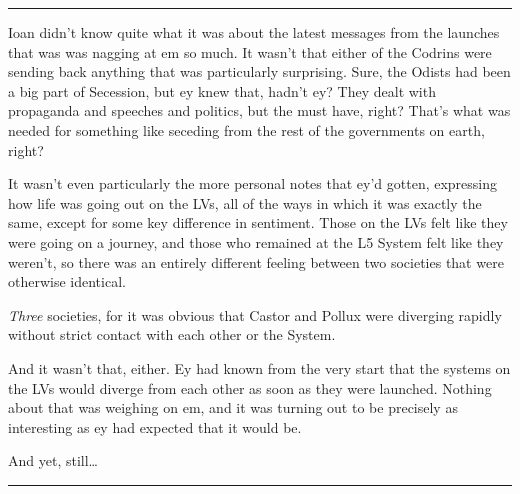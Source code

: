 \begin{center}\rule{0.5\linewidth}{0.5pt}\end{center}

Ioan didn't know quite what it was about the latest messages from the launches that was was nagging at em so much. It wasn't that either of the Codrins were sending back anything that was particularly surprising. Sure, the Odists had been a big part of Secession, but ey knew that, hadn't ey? They dealt with propaganda and speeches and politics, but the must have, right? That's what was needed for something like seceding from the rest of the governments on earth, right?

It wasn't even particularly the more personal notes that ey'd gotten, expressing how life was going out on the LVs, all of the ways in which it was exactly the same, except for some key difference in sentiment. Those on the LVs felt like they were going on a journey, and those who remained at the L5 System felt like they weren't, so there was an entirely different feeling between two societies that were otherwise identical.

\emph{Three} societies, for it was obvious that Castor and Pollux were diverging rapidly without strict contact with each other or the System.

And it wasn't that, either. Ey had known from the very start that the systems on the LVs would diverge from each other as soon as they were launched. Nothing about that was weighing on em, and it was turning out to be precisely as interesting as ey had expected that it would be.

And yet, still\ldots{}

\begin{center}\rule{0.5\linewidth}{0.5pt}\end{center}

